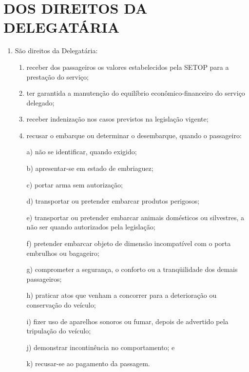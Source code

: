 \chapter{DOS DIREITOS DA DELEGATÁRIA}

\begin{enumerate}[resume, label=Art. \arabic*]

\item São direitos da Delegatária:

\begin{enumerate}[label=\roman*.]

\item receber dos passageiros os valores estabelecidos pela SETOP para a prestação do serviço;

\item ter garantida a manutenção do equilíbrio econômico-financeiro do serviço delegado;

\item receber indenização nos casos previstos na legislação vigente;

\item recusar o embarque ou determinar o desembarque, quando o passageiro:

a) não se identificar, quando exigido;

b) apresentar-se em estado de embriaguez;

c) portar arma sem autorização;

d) transportar ou pretender embarcar produtos perigosos;

e) transportar ou pretender embarcar animais domésticos ou silvestres, a não ser quando autorizados pela legislação;

f) pretender embarcar objeto de dimensão incompatível com o porta embrulhos ou bagageiro;

g) comprometer a segurança, o conforto ou a tranqüilidade dos demais passageiros;

h) praticar atos que venham a concorrer para a deterioração ou conservação do veículo;

i) fizer uso de aparelhos sonoros ou fumar, depois de advertido pela tripulação do veículo;

j) demonstrar incontinência no comportamento; e

k) recusar-se ao pagamento da passagem.

\end{enumerate}

\end{enumerate}